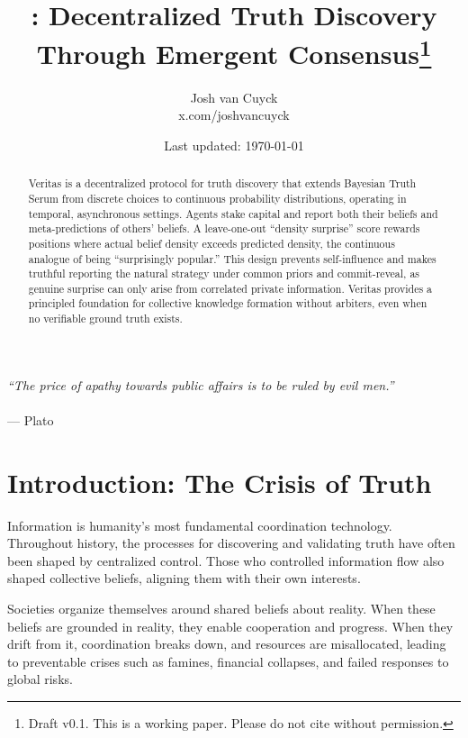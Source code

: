 \documentclass[11pt,a4paper]{article}
\title{\veritas{}: Decentralized Truth Discovery Through Emergent Consensus\thanks{Draft v0.1. This is a working paper. Please do not cite without permission.}}
\author{
    Josh van Cuyck\\
    \small{x.com/joshvancuyck}
}
\date{Last updated: \today}
\begin{document}
\maketitle

\begin{center}
\vspace{-0.8em}
\textit{``The price of apathy towards public affairs is to be ruled by evil men.''}\\\cite{plato_apology}\\
\vspace{0.2em}
--- Plato
\vspace{0.5em}
\end{center}

\begin{abstract}
Veritas is a decentralized protocol for truth discovery that extends Bayesian Truth Serum from discrete choices to continuous probability distributions, operating in temporal, asynchronous settings. Agents stake capital and report both their beliefs and meta-predictions of others' beliefs. A leave-one-out ``density surprise'' score rewards positions where actual belief density exceeds predicted density, the continuous analogue of being ``surprisingly popular.'' This design prevents self-influence and makes truthful reporting the natural strategy under common priors and commit-reveal, as genuine surprise can only arise from correlated private information. Veritas provides a principled foundation for collective knowledge formation without arbiters, even when no verifiable ground truth exists.
\end{abstract}

\newpage
\tableofcontents
\newpage

\section{Introduction: The Crisis of Truth}
\label{sec:introduction}

Information is humanity's most fundamental coordination technology. Throughout history, the processes for discovering and validating truth have often been shaped by centralized control. Those who controlled information flow also shaped collective beliefs, aligning them with their own interests.

Societies organize themselves around shared beliefs about reality. When these beliefs are grounded in reality, they enable cooperation and progress. When they drift from it, coordination breaks down, and resources are misallocated, leading to preventable crises such as famines, financial collapses, and failed responses to global risks.
\end{document}
